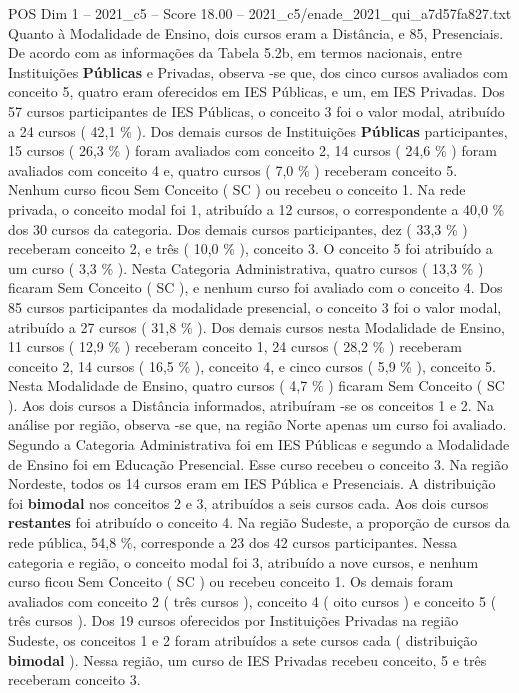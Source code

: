 \begin{textsample}{POS Dim 1 – 2021\_c5 – Score 18.00 – 2021\_c5/enade\_2021\_qui\_a7d57fa827.txt}
Quanto à Modalidade de Ensino, dois cursos eram a Distância, e 85, Presenciais.
De acordo com as informações da Tabela 5.2b, em termos nacionais, entre Instituições \textbf{Públicas} e Privadas, observa -se que, dos cinco cursos avaliados com conceito 5, quatro eram oferecidos em IES Públicas, e um, em IES Privadas.
Dos 57 cursos participantes de IES Públicas, o conceito 3 foi o valor modal, atribuído a 24 cursos ( 42,1 \% ).
Dos demais cursos de Instituições \textbf{Públicas} participantes, 15 cursos ( 26,3 \% ) foram avaliados com conceito 2, 14 cursos ( 24,6 \% ) foram avaliados com conceito 4 e, quatro cursos ( 7,0 \% ) receberam conceito 5.
Nenhum curso ficou Sem Conceito ( SC ) ou recebeu o conceito 1.
Na rede privada, o conceito modal foi 1, atribuído a 12 cursos, o correspondente a 40,0 \% dos 30 cursos da categoria.
Dos demais cursos participantes, dez ( 33,3 \% ) receberam conceito 2, e três ( 10,0 \% ), conceito 3.
O conceito 5 foi atribuído a um curso ( 3,3 \% ).
Nesta Categoria Administrativa, quatro cursos ( 13,3 \% ) ficaram Sem Conceito ( SC ), e nenhum curso foi avaliado com o conceito 4.
Dos 85 cursos participantes da modalidade presencial, o conceito 3 foi o valor modal, atribuído a 27 cursos ( 31,8 \% ).
Dos demais cursos nesta Modalidade de Ensino, 11 cursos ( 12,9 \% ) receberam conceito 1, 24 cursos ( 28,2 \% ) receberam conceito 2, 14 cursos ( 16,5 \% ), conceito 4, e cinco cursos ( 5,9 \% ), conceito 5.
Nesta Modalidade de Ensino, quatro cursos ( 4,7 \% ) ficaram Sem Conceito ( SC ).
Aos dois cursos a Distância informados, atribuíram -se os conceitos 1 e 2.
Na análise por região, observa -se que, na região Norte apenas um curso foi avaliado.
Segundo a Categoria Administrativa foi em IES Públicas e segundo a Modalidade de Ensino foi em Educação Presencial.
Esse curso recebeu o conceito 3.
Na região Nordeste, todos os 14 cursos eram em IES Pública e Presenciais.
A distribuição foi \textbf{bimodal} nos conceitos 2 e 3, atribuídos a seis cursos cada.
Aos dois cursos \textbf{restantes} foi atribuído o conceito 4.
Na região Sudeste, a proporção de cursos da rede pública, 54,8 \%, corresponde a 23 dos 42 cursos participantes.
Nessa categoria e região, o conceito modal foi 3, atribuído a nove cursos, e nenhum curso ficou Sem Conceito ( SC ) ou recebeu conceito 1.
Os demais foram avaliados com conceito 2 ( três cursos ), conceito 4 ( oito cursos ) e conceito 5 ( três cursos ).
Dos 19 cursos oferecidos por Instituições Privadas na região Sudeste, os conceitos 1 e 2 foram atribuídos a sete cursos cada ( distribuição \textbf{bimodal} ).
Nessa região, um curso de IES Privadas recebeu conceito, 5 e três receberam conceito 3.

\end{textsample}
